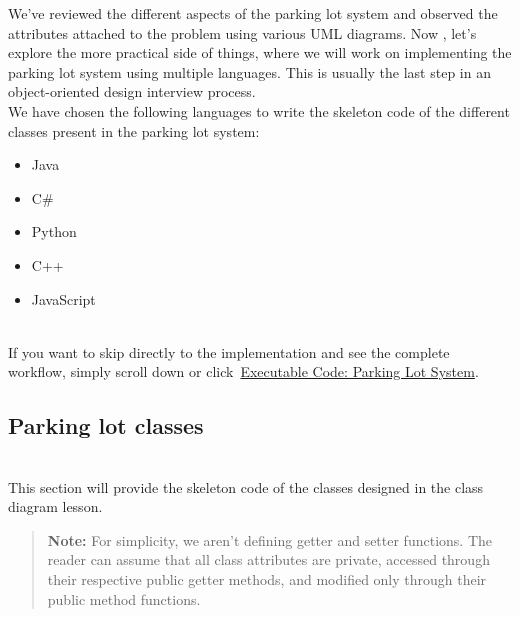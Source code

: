 

We've reviewed the different aspects of the parking lot system and observed the attributes attached to the problem using various UML diagrams. Now , let's explore the more practical side of things, where we will work on implementing the parking lot system using multiple languages. This is usually the last step in an object-oriented design interview process.
\\
We have chosen the following languages to write the skeleton code of the different classes present in the parking lot system:

\begin{itemize}
\item
\protect{}\label{_qpoOH6BVcZvs_OVsUnDJ}
Java
\item
\protect{}\label{twS78OUNyTY_wEw6mXikl}
C\#
\item
\protect{}\label{VC8aG5lMnY05_Rrq7D9MJ}
Python
\item
\protect{}\label{TGmtQJau4uIf2d7581Dox}
C++
\item
\protect{}\label{Yd0ySCdlteKUHbcuBUaxg}
JavaScript
\end{itemize}
\\
If you want to skip directly to the implementation and see the complete workflow, simply scroll down or click~\hyperref[Executable-code-Parking-lot-system]{Executable Code: Parking Lot System}.

\subsection{Parking lot classes}\label{nFLgbwaZhJD2iWxw0OHp9}
\\
This section will provide the skeleton code of the classes designed in the class diagram lesson.
\begin{quote}
\textbf{Note:} For simplicity, we aren't defining getter and setter functions. The reader can assume that all class attributes are private, accessed through their respective public getter methods, and modified only through their public method functions.
\end{quote}
